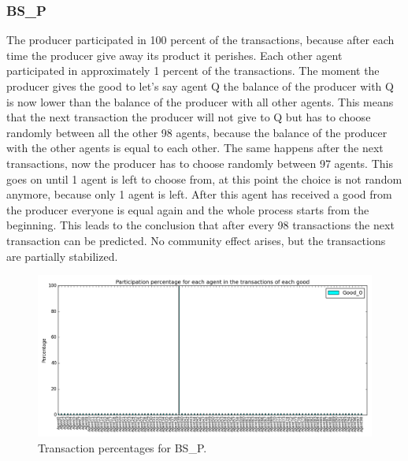 \documentclass[twoside,openright]{uva-bachelor-thesis}
\begin{document}
\subsubsection{BS\_P}
The producer participated in 100 percent of the transactions, because after each time the producer give away its product it perishes. Each other agent participated in approximately 1 percent of the transactions. The moment the producer gives the good to let's say agent Q the balance of the producer with Q is now lower than the balance of the producer with all other agents. This means that the next transaction the producer will not give to Q but has to choose randomly between all the other 98 agents, because the balance of the producer with the other agents is equal to each other. The same happens after the next transactions, now the producer has to choose randomly between 97 agents. This goes on until 1 agent is left to choose from, at this point the choice is not random anymore, because only 1 agent is left. After this agent has received a good from the producer everyone is equal again and the whole process starts from the beginning. This leads to the conclusion that after every 98 transactions the next transaction can be predicted. No community effect arises, but the transactions are partially stabilized. \\
\begin{figure}[h!]
\centering
\includegraphics[scale=0.4]{Simulation_figures/BR_BS_P/Figure1_10k} 
\caption{Transaction percentages for BS\_P.}
\end{figure}
\end{document}
